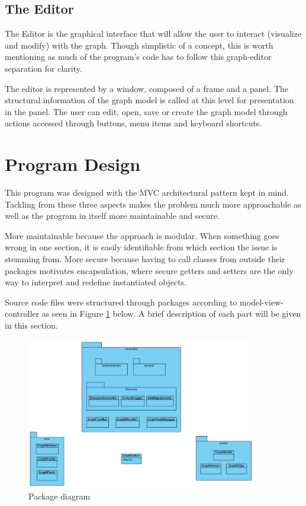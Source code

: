 \documentclass[a4paper]{article}
\begin{document}
\subsection{The Editor}
\par The Editor is the graphical interface that will allow the user to interact (visualize and modify) with the graph. Though simplistic of a concept, this is worth mentioning as much of the program's code has to follow this graph-editor separation for clarity. 
\par The editor is represented by a window, composed of a frame and a panel. The structural information of the graph model is called at this level for presentation in the panel. The user can edit, open, save or create the graph model through actions accessed through buttons, menu items and keyboard shortcuts.



\section{Program Design}
\par This program was designed with the MVC architectural pattern kept in mind. Tackling from these three aspects makes the problem much more approachable as well as the program in itself more maintainable and secure. 
\par More maintainable because the approach is modular. When something goes wrong in one section, it is easily identifiable from which section the issue is stemming from. More secure because having to call classes from outside their packages motivates encapsulation, where secure getters and setters are the only way to  interpret and redefine instantiated objects.
\par Source code files were structured through packages according to model-view-controller as seen in Figure \ref{fig: PackageDiagram} below. A brief description of each part will be given in this section. \\

\begin{figure}[h!]
    \centering
    \includegraphics[width=0.9\textwidth]{im/PackageDiagram.png}
    \caption{Package diagram}
    \label{fig: PackageDiagram}
\end{figure}
\end{document}
